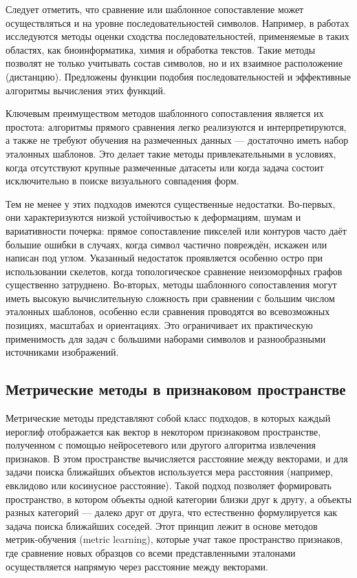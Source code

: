 Следует отметить, что сравнение или шаблонное сопоставление может осуществляться и на уровне последовательностей символов. Например, в работах \cite{бурдоновкомпьютерная, бурдонов2023двадцать} исследуются методы оценки сходства последовательностей, применяемые в таких областях, как биоинформатика, химия и обработка текстов. Такие методы позволят не только учитывать состав символов, но и их взаимное расположение (дистанцию). Предложены функции подобия последовательностей и эффективные алгоритмы вычисления этих функций.

Ключевым преимуществом методов шаблонного сопоставления является их простота: алгоритмы прямого сравнения легко реализуются и интерпретируются, а также не требуют обучения на размеченных данных — достаточно иметь набор эталонных шаблонов. Это делает такие методы привлекательными в условиях, когда отсутствуют крупные размеченные датасеты или когда задача состоит исключительно в поиске визуального совпадения форм.

Тем не менее у этих подходов имеются существенные недостатки. Во-первых, они характеризуются низкой устойчивостью к деформациям, шумам и вариативности почерка: прямое сопоставление пикселей или контуров часто даёт большие ошибки в случаях, когда символ частично повреждён, искажен или написан под углом. Указанный недостаток проявляется особенно остро при использовании скелетов, когда топологическое сравнение неизоморфных графов существенно затруднено. Во-вторых, методы шаблонного сопоставления могут иметь высокую вычислительную сложность при сравнении с большим числом эталонных шаблонов, особенно если сравнения проводятся во всевозможных позициях, масштабах и ориентациях. Это ограничивает их практическую применимость для задач с большими наборами символов и разнообразными источниками изображений.

\subsection{Метрические методы в признаковом пространстве}
Метрические методы представляют собой класс подходов, в которых каждый иероглиф отображается как вектор в некотором признаковом пространстве, полученном с помощью нейросетевого или другого алгоритма извлечения признаков. В этом пространстве вычисляется расстояние между векторами, и для задачи поиска ближайших объектов используется мера расстояния (например, евклидово или косинусное расстояние). Такой подход позволяет формировать пространство, в котором объекты одной категории близки друг к другу, а объекты разных категорий — далеко друг от друга, что естественно формулируется как задача поиска ближайших соседей. Этот принцип лежит в основе методов метрик-обучения (metric learning), которые учат такое пространство признаков, где сравнение новых образцов со всеми представленными эталонами осуществляется напрямую через расстояние между векторами.

